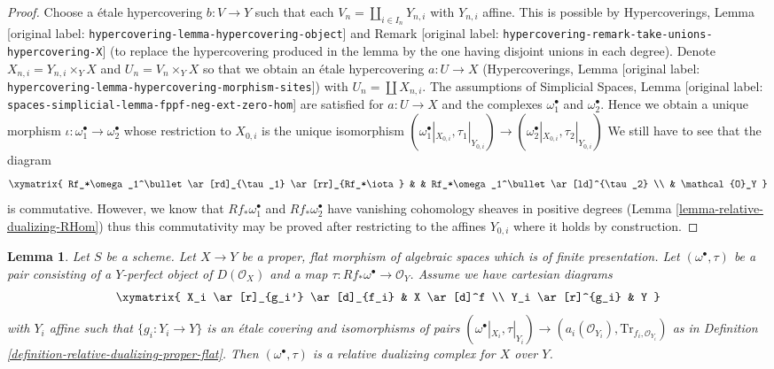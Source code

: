 \documentclass[10pt,a4paper]{article}
\theoremstyle{plain}
\newtheorem{lemma}[subsection]{Lemma}
\theoremstyle{definition}
\theoremstyle{remark}
\numberwithin{equation}{subsection}
\begin{document}
\begin{proof}
\medskip\noindent
Choose a \'etale hypercovering $b : V \to Y$ such that each
$V_n = \coprod_{i \in I_n} Y_{n, i}$ with $Y_{n, i}$ affine.
This is possible by Hypercoverings, Lemma
\textnormal{[original label: \nolinkurl{hypercovering-lemma-hypercovering-object}]} and
Remark \textnormal{[original label: \nolinkurl{hypercovering-remark-take-unions-hypercovering-X}]}
(to replace the hypercovering produced
in the lemma by the one having disjoint unions in each degree).
Denote $X_{n, i} = Y_{n, i} \times_Y X$ and $U_n = V_n \times_Y X$
so that we obtain an \'etale hypercovering
$a : U \to X$ (Hypercoverings, Lemma
\textnormal{[original label: \nolinkurl{hypercovering-lemma-hypercovering-morphism-sites}]})
with $U_n = \coprod X_{n, i}$.
The assumptions of Simplicial Spaces, Lemma
\textnormal{[original label: \nolinkurl{spaces-simplicial-lemma-fppf-neg-ext-zero-hom}]}
are satisfied for $a : U \to X$ and the complexes
$\omega_1^\bullet$ and $\omega_2^\bullet$.
Hence we obtain a unique morphism
$\iota : \omega_1^\bullet \to \omega_2^\bullet$
whose restriction to $X_{0, i}$ is the unique
isomorphism $(\omega_1^\bullet|_{X_{0, i}}, \tau_1|_{Y_{0, i}}) \to
(\omega_2^\bullet|_{X_{0, i}}, \tau_2|_{Y_{0, i}})$
We still have to see that the diagram
$$
\xymatrix{
Rf_*\omega_1^\bullet \ar[rd]_{\tau_1} \ar[rr]_{Rf_*\iota} & &
Rf_*\omega_1^\bullet \ar[ld]^{\tau_2} \\
& \mathcal{O}_Y
}
$$
is commutative. However, we know that $Rf_*\omega_1^\bullet$ and
$Rf_*\omega_2^\bullet$ have vanishing cohomology sheaves in positive
degrees (Lemma \ref{lemma-relative-dualizing-RHom})
thus this commutativity may be proved after
restricting to the affines $Y_{0, i}$ where it holds by construction.
\end{proof}

\begin{lemma}
\label{lemma-covering-enough}
Let $S$ be a scheme. Let $X \to Y$ be a proper, flat morphism of
algebraic spaces which is of finite presentation.
Let $(\omega^\bullet, \tau)$ be a pair consisting
of a $Y$-perfect object of $D(\mathcal{O}_X)$ and a map
$\tau : Rf_*\omega^\bullet \to \mathcal{O}_Y$.
Assume we have cartesian diagrams
$$
\xymatrix{
X_i \ar[r]_{g_i'} \ar[d]_{f_i} & X \ar[d]^f \\
Y_i \ar[r]^{g_i} & Y
}
$$
with $Y_i$ affine such that $\{g_i : Y_i \to Y\}$ is an \'etale covering
and isomorphisms of pairs $(\omega^\bullet|_{X_i}, \tau|_{Y_i})
\to (a_i(\mathcal{O}_{Y_i}), \text{Tr}_{f_i, \mathcal{O}_{Y_i}})$
as in Definition \ref{definition-relative-dualizing-proper-flat}.
Then $(\omega^\bullet, \tau)$ is a relative dualizing complex for $X$ over $Y$.
\end{lemma}
\end{document}
